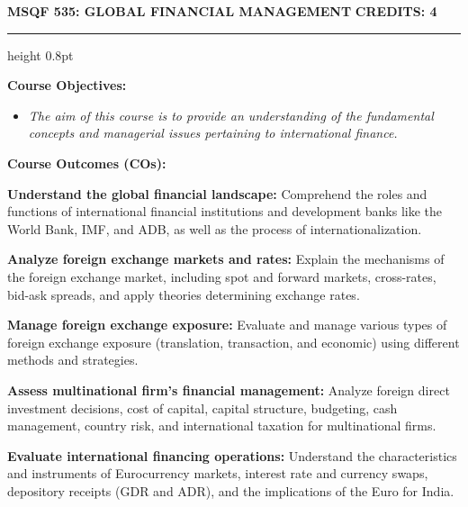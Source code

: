 
\newpage
\thispagestyle{plain}

\begin{center}
    {\large\textbf{MSQF 535: GLOBAL FINANCIAL MANAGEMENT}} \hfill {\large\textbf{CREDITS: 4}}
\end{center}
\vspace{-0.7em}
\hrule height 0.8pt
\vspace{0.35em}

\noindent\textbf{Course Objectives:}
\begin{itemize}[leftmargin=1.2em, label=$\bullet$, noitemsep, topsep=1pt, parsep=0pt]
    \item \small\textit{The aim of this course is to provide an understanding of the fundamental concepts and managerial issues pertaining to international finance.}\normalsize
\end{itemize}

\vspace{0.25em}
\noindent\textbf{Course Outcomes (COs):}
\begin{description}[leftmargin=1.1cm, labelsep=0.3em, itemsep=0.5pt, topsep=1pt, parsep=0pt, font=\normalfont\small\bfseries]
    \small
    \item[CO1:] \textbf{Understand the global financial landscape:} Comprehend the roles and functions of international financial institutions and development banks like the World Bank, IMF, and ADB, as well as the process of internationalization.
    \item[CO2:] \textbf{Analyze foreign exchange markets and rates:} Explain the mechanisms of the foreign exchange market, including spot and forward markets, cross-rates, bid-ask spreads, and apply theories determining exchange rates.
    \item[CO3:] \textbf{Manage foreign exchange exposure:} Evaluate and manage various types of foreign exchange exposure (translation, transaction, and economic) using different methods and strategies.
    \item[CO4:] \textbf{Assess multinational firm's financial management:} Analyze foreign direct investment decisions, cost of capital, capital structure, budgeting, cash management, country risk, and international taxation for multinational firms.
    \item[CO5:] \textbf{Evaluate international financing operations:} Understand the characteristics and instruments of Eurocurrency markets, interest rate and currency swaps, depository receipts (GDR and ADR), and the implications of the Euro for India.
    \normalsize
\end{description}

